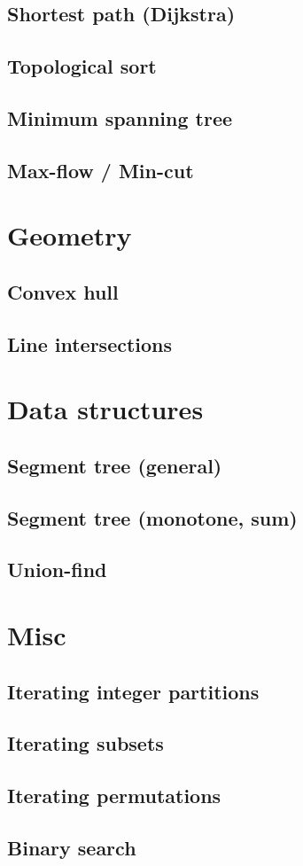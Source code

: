 \documentclass[a4paper,10pt]{article}
\begin{document}
\subsection{Shortest path (Dijkstra)}

\subsection{Topological sort}
\subsection{Minimum spanning tree}
\subsection{Max-flow / Min-cut}


\section{Geometry}
\subsection{Convex hull}

\subsection{Line intersections}
\section{Data structures}
\subsection{Segment tree (general)}
%
\subsection{Segment tree (monotone, sum)}

\subsection{Union-find}

\section{Misc}
\subsection{Iterating integer partitions}
\subsection{Iterating subsets}

\subsection{Iterating permutations}

\subsection{Binary search}
\end{document}

